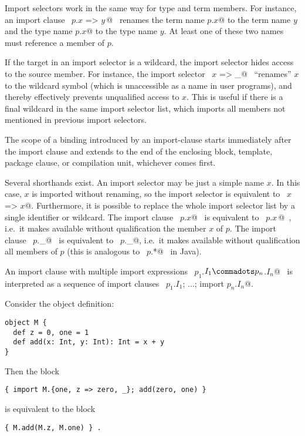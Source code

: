 Import selectors work in the same way for type and term members. For
instance, an import clause ~\lstinline@import $p$.{$x$ => $y\,$}@~ renames the term
name \lstinline@$p$.$x$@ to the term name $y$ and the type name \lstinline@$p$.$x$@
to the type name $y$. At least one of these two names must
reference a member of $p$.

If the target in an import selector is a wildcard, the import selector
hides access to the source member. For instance, the import selector
~\lstinline@$x$ => _@~ ``renames'' $x$ to the wildcard symbol (which is
unaccessible as a name in user programs), and thereby effectively
prevents unqualified access to $x$. This is useful if there is a
final wildcard in the same import selector list, which imports all
members not mentioned in previous import selectors.

The scope of a binding introduced by an import-clause starts
immediately after the import clause and extends to the end of the
enclosing block, template, package clause, or compilation unit,
whichever comes first.

Several shorthands exist. An import selector may be just a simple name
$x$. In this case, $x$ is imported without renaming, so the
import selector is equivalent to ~\lstinline@$x$ => $x$@. Furthermore, it is
possible to replace the whole import selector list by a single
identifier or wildcard. The import clause ~\lstinline@import $p$.$x$@~ is
equivalent to ~\lstinline@import $p$.{$x\,$}@~, i.e.\ it makes available without
qualification the member $x$ of $p$. The import clause
~\lstinline@import $p$._@~ is equivalent to
~\lstinline@import $p$.{_}@, 
i.e.\ it makes available without qualification all members of $p$
(this is analogous to ~\lstinline@import $p$.*@~ in Java).

An import clause with multiple import expressions
~\lstinline@import $p_1$.$I_1 \commadots p_n$.$I_n$@~ is interpreted as a
sequence of import clauses 
~\lstinline@import $p_1$.$I_1$; $\ldots$; import $p_n$.$I_n$@.

\example Consider the object definition:
\begin{lstlisting}
object M { 
  def z = 0, one = 1  
  def add(x: Int, y: Int): Int = x + y 
}
\end{lstlisting}
Then the block
\begin{lstlisting}
{ import M.{one, z => zero, _}; add(zero, one) }
\end{lstlisting}
is equivalent to the block 
\begin{lstlisting}
{ M.add(M.z, M.one) } .
\end{lstlisting}

